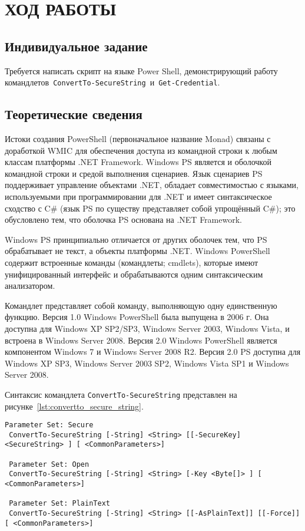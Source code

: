 \section{ХОД РАБОТЫ}
\subsection{Индивидуальное задание}

Требуется написать скрипт на языке Power Shell, демонстрирующий работу
командлетов~\texttt{ConvertTo-SecureString}~и~\texttt{Get-Credential}.


\subsection{Теоретические сведения}

Истоки создания PowerShell (первоначальное название Monad) связаны с
доработкой WMIC для обеспечения доступа из командной строки к любым классам
платформы .NET Framework. Windows PS является и оболочкой командной строки
и средой выполнения сценариев.
Язык сценариев PS поддерживает управление объектами .NET,
обладает совместимостью с языками, используемыми при программировании
для .NET и имеет синтаксическое сходство с C\# (язык PS по существу
представляет собой упрощённый C\#); это обусловлено тем, что  оболочка PS
основана на .NET Framework.

Windows  PS принципиально  отличается от других оболочек тем,
что PS обрабатывает не текст, а объекты платформы .NET.
Windows  PowerShell содержит встроенные команды (командлеты; cmdlets),
которые имеют унифицированный интерфейс и обрабатываются одним
синтаксическим анализатором.

Командлет представляет собой команду, выполняющую одну единственную функцию.
Версия 1.0 Windows PowerShell была выпущена в 2006 г.
Она доступна для Windows XP SP2/SP3, Windows Server 2003, Windows Vista,
и встроена в Windows Server 2008. Версия 2.0 Windows PowerShell является
компонентом Windows 7 и Windows Server 2008 R2.
Версия 2.0 PS доступна для Windows XP SP3, Windows Server 2003 SP2,
Windows Vista SP1 и Windows Server 2008.

\pagebreak

Синтаксис командлета \texttt{ConvertTo-SecureString} представлен на
рисунке~\ref{lst:convertto_secure_string}.
\begin{lstlisting}[caption={Синтаксис командлета \texttt{ConvertTo-SecureString}},
label=lst:convertto_secure_string,basicstyle=\scriptsize\ttfamily]
 Parameter Set: Secure
 ConvertTo-SecureString [-String] <String> [[-SecureKey] <SecureString> ] [ <CommonParameters>]

 Parameter Set: Open
 ConvertTo-SecureString [-String] <String> [-Key <Byte[]> ] [ <CommonParameters>]

 Parameter Set: PlainText
 ConvertTo-SecureString [-String] <String> [[-AsPlainText]] [[-Force]] [ <CommonParameters>]
\end{lstlisting}

